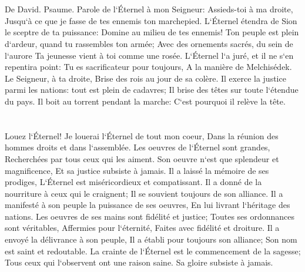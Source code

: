 \chapter{}

\verse De David. Psaume. Parole de l`Éternel à mon Seigneur: Assieds-toi à ma droite, Jusqu`à ce que je fasse de tes ennemis ton marchepied. 
\verse L`Éternel étendra de Sion le sceptre de ta puissance: Domine au milieu de tes ennemis! 
\verse Ton peuple est plein d`ardeur, quand tu rassembles ton armée; Avec des ornements sacrés, du sein de l`aurore Ta jeunesse vient à toi comme une rosée. 
\verse L`Éternel l`a juré, et il ne s`en repentira point: Tu es sacrificateur pour toujours, A la manière de Melchisédek. 
\verse Le Seigneur, à ta droite, Brise des rois au jour de sa colère. 
\verse Il exerce la justice parmi les nations: tout est plein de cadavres; Il brise des têtes sur toute l`étendue du pays. 
\verse Il boit au torrent pendant la marche: C`est pourquoi il relève la tête. 

\chapter{}

\verse Louez l`Éternel! Je louerai l`Éternel de tout mon coeur, Dans la réunion des hommes droits et dans l`assemblée. 
\verse Les oeuvres de l`Éternel sont grandes, Recherchées par tous ceux qui les aiment. 
\verse Son oeuvre n`est que splendeur et magnificence, Et sa justice subsiste à jamais. 
\verse Il a laissé la mémoire de ses prodiges, L`Éternel est miséricordieux et compatissant. 
\verse Il a donné de la nourriture à ceux qui le craignent; Il se souvient toujours de son alliance. 
\verse Il a manifesté à son peuple la puissance de ses oeuvres, En lui livrant l`héritage des nations. 
\verse Les oeuvres de ses mains sont fidélité et justice; Toutes ses ordonnances sont véritables, 
\verse Affermies pour l`éternité, Faites avec fidélité et droiture. 
\verse Il a envoyé la délivrance à son peuple, Il a établi pour toujours son alliance; Son nom est saint et redoutable. 
\verse La crainte de l`Éternel est le commencement de la sagesse; Tous ceux qui l`observent ont une raison saine. Sa gloire subsiste à jamais. 

\chapter{}

